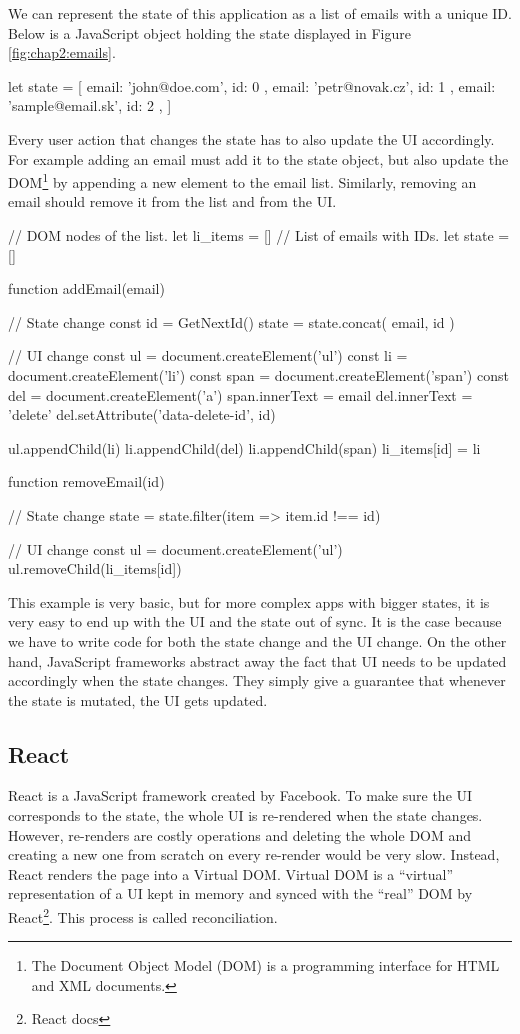 We can represent the state of this application as a list of emails with a unique ID. Below is a JavaScript object holding the state displayed in
Figure \ref{fig:chap2:emails}.
\begin{code}
let state = [
    { email: 'john@doe.com', id: 0 },
    { email: 'petr@novak.cz', id: 1 },
    { email: 'sample@email.sk', id: 2 },
]
\end{code}

Every user action that changes the state has to also update the UI accordingly. For example adding an email must add it to the state object, but also update
the DOM\footnote{The Document Object Model (DOM) is a programming interface for HTML and XML documents.} by appending a new element to the email list.
Similarly, removing an email should remove it from the list and from the UI.
\begin{code}
// DOM nodes of the list.
let li_items = []
// List of emails with IDs.
let state = []

function addEmail(email) {
    // State change
    const id = GetNextId()
    state = state.concat({ email, id })

    // UI change
    const ul = document.createElement('ul')
    const li = document.createElement('li')
    const span = document.createElement('span')
    const del = document.createElement('a')
    span.innerText = email
    del.innerText = 'delete'
    del.setAttribute('data-delete-id', id)

    ul.appendChild(li)
    li.appendChild(del)
    li.appendChild(span)
    li_items[id] = li
}

function removeEmail(id) {
    // State change
    state = state.filter(item => item.id !== id)

    // UI change
    const ul = document.createElement('ul')
    ul.removeChild(li_items[id])
}
\end{code}

This example is very basic, but for more complex apps with bigger states, it is very easy to end up with the UI and the state out of sync. It is the case
because we have to write code for both the state change and the UI change. On the other hand, JavaScript frameworks abstract away the fact that UI needs
to be updated accordingly when the state changes. They simply give a guarantee that whenever the state is mutated, the UI gets updated.

\subsection{React}
React \cite{React} is a JavaScript framework created by Facebook. To make sure the UI corresponds to the state, the whole UI is re-rendered
when the state changes. However, re-renders are costly operations and deleting the whole DOM and creating a new one from scratch on every re-render
would be very slow. Instead, React renders the page into a Virtual DOM. Virtual DOM is a “virtual” representation of a UI kept in memory and
synced with the “real” DOM by React\footnote{React docs}. This process is called reconciliation.

